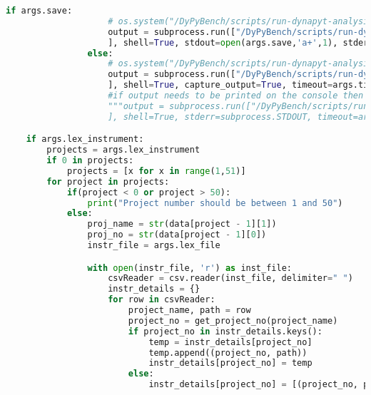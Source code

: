 \begin{lstlisting}[caption=Access Interface of DyPyBench,label=code:dypybench.py,language=Python]
                if args.save:
                    # os.system("/DyPyBench/scripts/run-dynapyt-analysis.sh %s %s %s %s >> %s 2>&1" %(proj_name, proj_no, analysis, proj_test_folder, args.save))
                    output = subprocess.run(["/DyPyBench/scripts/run-dynapyt-analysis.sh %s %s %s %s %s" %(proj_name, proj_no, analysis, proj_test_folder, args.timeout)
                    ], shell=True, stdout=open(args.save,'a+',1), stderr=subprocess.STDOUT, timeout=args.timeout)
                else:
                    # os.system("/DyPyBench/scripts/run-dynapyt-analysis.sh %s %s %s %s" %(proj_name, proj_no, analysis, proj_test_folder))
                    output = subprocess.run(["/DyPyBench/scripts/run-dynapyt-analysis.sh %s %s %s %s %s" %(proj_name, proj_no, analysis, proj_test_folder, args.timeout)
                    ], shell=True, capture_output=True, timeout=args.timeout)
                    #if output needs to be printed on the console then comment above and uncomment below
                    """output = subprocess.run(["/DyPyBench/scripts/run-dynapyt-analysis.sh %s %s %s %s %s" %(proj_name, proj_no, analysis, proj_test_folder, args.timeout)
                    ], shell=True, stderr=subprocess.STDOUT, timeout=args.timeout)"""

    if args.lex_instrument:
        projects = args.lex_instrument
        if 0 in projects:
            projects = [x for x in range(1,51)]
        for project in projects:
            if(project < 0 or project > 50):
                print("Project number should be between 1 and 50")
            else:
                proj_name = str(data[project - 1][1])
                proj_no = str(data[project - 1][0])
                instr_file = args.lex_file

                with open(instr_file, 'r') as inst_file:
                    csvReader = csv.reader(inst_file, delimiter=" ")
                    instr_details = {}
                    for row in csvReader:
                        project_name, path = row
                        project_no = get_project_no(project_name)
                        if project_no in instr_details.keys():
                            temp = instr_details[project_no]
                            temp.append((project_no, path))
                            instr_details[project_no] = temp
                        else:
                            instr_details[project_no] = [(project_no, path)]


\end{lstlisting}

